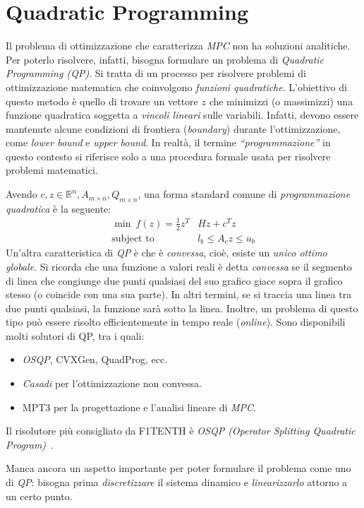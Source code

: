 \section{Quadratic Programming}
Il problema di ottimizzazione che caratterizza \textit{MPC} non ha soluzioni analitiche. 
Per poterlo risolvere, infatti, bisogna formulare un problema di
\textit{Quadratic Programming (QP)}. Si tratta di un processo per risolvere problemi di 
ottimizzazione matematica che coinvolgono \textit{funzioni quadratiche}. L'obiettivo di questo 
metodo è quello di trovare un vettore $z$ che minimizzi (o massimizzi) una funzione quadratica 
soggetta a \textit{vincoli lineari} sulle variabili.
Infatti, devono essere mantenute alcune condizioni di frontiera (\textit{boundary}) durante 
l’ottimizzazione, come \textit{lower bound} e \textit{upper bound}. 
In realtà, il termine \textit{``programmazione''} in questo contesto si riferisce solo a una procedura formale usata per risolvere problemi matematici.

Avendo $c,z \in \mathbb{R}^n, A_{m \times n}, Q_{m \times n}$, una forma standard 
comune di \textit{programmazione quadratica} è la seguente:
\[
\begin{aligned}
\min \ f(z) = \frac{1}{2} z^T & Hz + c^Tz \\
\text{subject to } \ & l_b \leq A_c z \leq u_b
\end{aligned}
\]
Un'altra caratteristica di \textit{QP} è che è \textit{convessa}, cioè, esiste un \textit{unico ottimo globale}.
Si ricorda che una funzione a valori reali è detta \textit{convessa} se il segmento di linea che 
congiunge due punti qualsiasi del suo grafico giace sopra il grafico stesso (o coincide con una 
sua parte). In altri termini, se si traccia una linea tra due punti qualsiasi, la funzione sarà sotto la linea.
Inoltre, un problema di questo tipo può essere risolto efficientemente in tempo reale 
(\textit{online}). Sono disponibili molti solutori di QP, tra i quali:
\begin{itemize}
    \item \textit{OSQP}, CVXGen, QuadProg, ecc.
    \item \textit{Casadi} per l’ottimizzazione non convessa.
    \item MPT3 per la progettazione e l'analisi lineare di \textit{MPC}.
\end{itemize}
Il risolutore più consigliato da F1TENTH è \textit{OSQP (Operator Splitting Quadratic Program)}~\cite{osqp}.

Manca ancora un aspetto importante per poter formulare il problema 
come uno di \textit{QP}: bisogna prima \textit{discretizzare} il sistema dinamico 
e \textit{linearizzarlo} attorno a un certo punto.

